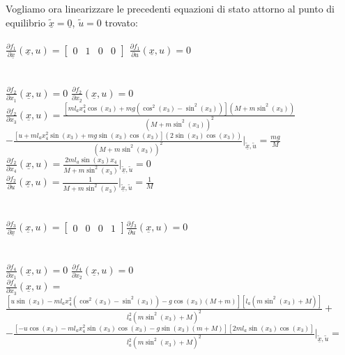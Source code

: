 Vogliamo ora linearizzare le precedenti equazioni di stato attorno al punto di equilibrio $\underline{\tilde{x}}=\underline{0}$, $\tilde{u}=0$ trovato: \\\\
$\displaystyle\frac{\partial{f_1}}{\partial{\underline{x}}}(\underline x,u)=
\begin{bmatrix}
0&1&0&0
\end{bmatrix}$\qquad
$\displaystyle\frac{\partial{f_1}}{\partial{u}}(\underline{x},u)=0$\\\\\\
$\displaystyle\frac{\partial{f_2}}{\partial{x_1}}(\underline{x},u)=0$\qquad
$\displaystyle\frac{\partial{f_2}}{\partial{x_2}}(\underline{x},u)=0$\\
$\displaystyle\frac{\partial{f_2}}{\partial{x_3}}(\underline{x},u)=\displaystyle\frac{[ml_ax_4^2\cos(x_3)+mg(\cos^2(x_3)-\sin^2(x_3))](M+m\sin^2(x_3))}{(M+m\sin^2(x_3))^2}$\\
$-\displaystyle\frac{[u+ml_ax_4^2\sin(x_3)+mg\sin(x_3)\cos(x_3)](2\sin(x_3)\cos(x_3))}{(M+m\sin^2(x_3))^2}\bigg|_{\underline{\tilde{x}},\tilde{u}}=\displaystyle\frac{mg}{M}$\\ $\displaystyle\frac{\partial{f_2}}{\partial{x_4}}(\underline{x},u)=\displaystyle\frac{2ml_a\sin(x_3)x_4}{M+m\sin^2(x_3)}\bigg|_{\underline{\tilde{x}},\tilde{u}}=0$\\
$\displaystyle\frac{\partial{f_2}}{\partial{u}}(\underline{x},u)=\displaystyle\frac{1}{M+m\sin^2(x_3)}\bigg|_{\underline{\tilde{x}},\tilde{u}}=\displaystyle\frac{1}{M}$\\\\\\
$\displaystyle\frac{\partial{f_3}}{\partial{\underline{x}}}(\underline x,u)=
\begin{bmatrix}
0&0&0&1
\end{bmatrix}$\qquad$\displaystyle\frac{\partial{f_3}}{\partial{u}}(\underline{x},u)=0$\\\\\\
$\displaystyle\frac{\partial{f_4}}{\partial{x_1}}(\underline{x},u)=0$\qquad
$\displaystyle\frac{\partial{f_4}}{\partial{x_2}}(\underline{x},u)=0$\\
$\displaystyle\frac{\partial{f_4}}{\partial{x_3}}(\underline{x},u)=$\\$\displaystyle\frac{[u\sin(x_3)-ml_ax_4^2(\cos^2(x_3)-\sin^2(x_3))-g\cos(x_3)(M+m)][l_a(m\sin^2(x_3)+M)]}{l_a^2(m\sin^2(x_3)+M)^2}+$ $-\displaystyle\frac{[-u\cos(x_3)-ml_ax^2_4\sin(x_3)\cos(x_3)-g\sin(x_3)(m+M)][2ml_a\sin(x_3)\cos(x_3)]}{l_a^2(m\sin^2(x_3)+M)^2}\bigg|_{\underline{\tilde{x}},\tilde{u}}=$
